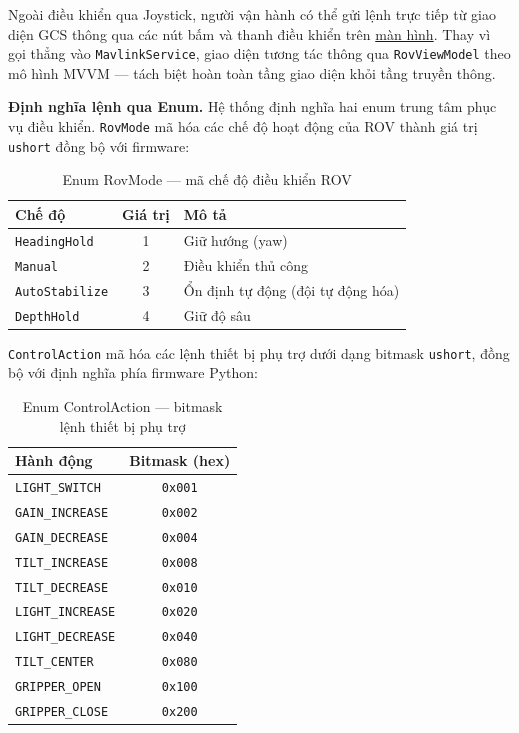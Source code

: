 \documentclass[../DoAn.tex]{subfiles}
\begin{document}
Ngoài điều khiển qua Joystick, người vận hành có thể gửi lệnh trực
tiếp từ giao diện GCS thông qua các nút bấm và thanh điều khiển trên
\hyperref[fig:mission_control]{màn hình}. Thay vì gọi thẳng vào \texttt{MavlinkService}, giao diện
tương tác thông qua \texttt{RovViewModel} theo mô hình MVVM --- tách
biệt hoàn toàn tầng giao diện khỏi tầng truyền thông.

\textbf{Định nghĩa lệnh qua Enum.}
Hệ thống định nghĩa hai enum trung tâm phục vụ điều khiển. \texttt{RovMode}
mã hóa các chế độ hoạt động của ROV thành giá trị \texttt{ushort}
đồng bộ với firmware:

\begin{table}[H]
\centering
\renewcommand{\arraystretch}{1.3}
\begin{tabular}{|l|c|l|}
\hline
\textbf{Chế độ} & \textbf{Giá trị} & \textbf{Mô tả} \\
\hline
\texttt{HeadingHold}   & 1 & Giữ hướng (yaw) \\
\texttt{Manual}        & 2 & Điều khiển thủ công \\
\texttt{AutoStabilize} & 3 & Ổn định tự động (đội tự động hóa) \\
\texttt{DepthHold}     & 4 & Giữ độ sâu \\
\hline
\end{tabular}
\caption{Enum RovMode — mã chế độ điều khiển ROV}
\label{tab:rov_mode}
\end{table}

\texttt{ControlAction} mã hóa các lệnh thiết bị phụ trợ dưới dạng
bitmask \texttt{ushort}, đồng bộ với định nghĩa phía firmware Python:

\begin{table}[H]
\centering
\renewcommand{\arraystretch}{1.3}
\begin{tabular}{|l|c|}
\hline
\textbf{Hành động} & \textbf{Bitmask (hex)} \\
\hline
\texttt{LIGHT\_SWITCH}   & \texttt{0x001} \\
\texttt{GAIN\_INCREASE}  & \texttt{0x002} \\
\texttt{GAIN\_DECREASE}  & \texttt{0x004} \\
\texttt{TILT\_INCREASE}  & \texttt{0x008} \\
\texttt{TILT\_DECREASE}  & \texttt{0x010} \\
\texttt{LIGHT\_INCREASE} & \texttt{0x020} \\
\texttt{LIGHT\_DECREASE} & \texttt{0x040} \\
\texttt{TILT\_CENTER}    & \texttt{0x080} \\
\texttt{GRIPPER\_OPEN}   & \texttt{0x100} \\
\texttt{GRIPPER\_CLOSE}  & \texttt{0x200} \\
\hline
\end{tabular}
\caption{Enum ControlAction — bitmask lệnh thiết bị phụ trợ}
\label{tab:control_action}
\end{table}
\end{document}

